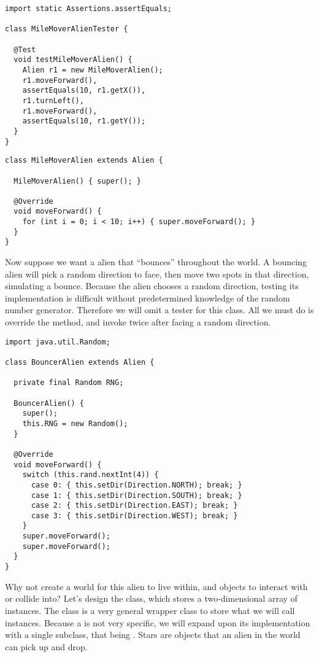 \begin{lstlisting}[language=MyJava]
import static Assertions.assertEquals;

class MileMoverAlienTester {

  @Test
  void testMileMoverAlien() {
    Alien r1 = new MileMoverAlien();
    r1.moveForward(),
    assertEquals(10, r1.getX()),
    r1.turnLeft(),
    r1.moveForward(),
    assertEquals(10, r1.getY());
  }
}
\end{lstlisting}

\begin{lstlisting}[language=MyJava]
class MileMoverAlien extends Alien {

  MileMoverAlien() { super(); }

  @Override
  void moveForward() {
    for (int i = 0; i < 10; i++) { super.moveForward(); }
  }
}
\end{lstlisting}

Now suppose we want a alien that ``bounces'' throughout the world. A bouncing alien will pick a random direction to face, then move two spots in that direction, simulating a bounce. Because the alien chooses a random direction, testing its implementation is difficult without predetermined knowledge of the random number generator. Therefore we will omit a tester for this class. All we must do is override the  method, and invoke  twice after facing a random direction.

\begin{lstlisting}[language=MyJava]
import java.util.Random;

class BouncerAlien extends Alien {

  private final Random RNG;

  BouncerAlien() {
    super();
    this.RNG = new Random();
  }

  @Override
  void moveForward() {
    switch (this.rand.nextInt(4)) {
      case 0: { this.setDir(Direction.NORTH); break; }
      case 1: { this.setDir(Direction.SOUTH); break; }
      case 2: { this.setDir(Direction.EAST); break; }
      case 3: { this.setDir(Direction.WEST); break; }
    }
    super.moveForward();
    super.moveForward();
  }
}
\end{lstlisting}

Why not create a world for this alien to live within, and objects to interact with or collide into? Let's design the  class, which stores a two-dimensional array of  instances. The  class is a very general wrapper class to store what we will call  instances. Because a  is not very specific, we will expand upon its implementation with a single subclass, that being . Stars are objects that an alien in the world can pick up and drop. 

